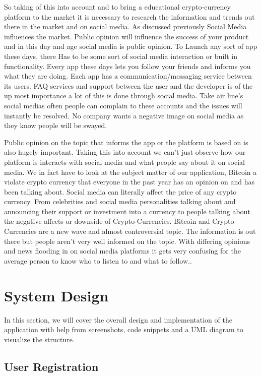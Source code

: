 So taking of this into account and to bring a educational crypto-currency platform to the market it is necessary to research the information and trends out there in the market and on social media. As discussed previously Social Media influences the market. Public opinion will influence the success of your product and in this day and age social media is public opinion. To Launch any sort of app these days, there Has to be some sort of social media interaction or built in functionality. Every app these days lets you follow your friends and informs you what they are doing. Each app has a communication/messaging service between its users. FAQ services and support between the user and the developer is of the up most importance a lot of this is done through social media. Take air line's social medias often people can complain to these accounts and the issues will instantly be resolved. No company wants a negative image on social media as they know people will be swayed. 

Public opinion on the topic that informs the app or the platform is based on is also hugely important. Taking this into account we can't just observe how our platform is interacts with social media and what people say about it on social media. We in fact have to look at the subject matter of our application, Bitcoin a violate crypto currency that everyone in the past year has an opinion on and has been talking about. Social media can literally affect the price of any crypto currency. From celebrities and social media personalities talking about and announcing their support or investment into a currency to people talking about the negative affects or downside of Crypto-Currencies. Bitcoin and Crypto-Currencies are a new wave and almost controversial topic. The information is out there but people aren't very well informed on the topic. With differing opinions and news flooding in on social media platforms it gets very confusing for the average person to know who to listen to and what to follow..


\chapter{System Design}
In this section, we will cover the overall design and implementation of the application with help from screenshots, code snippets and a UML diagram to visualize the structure.

\section{User Registration}

